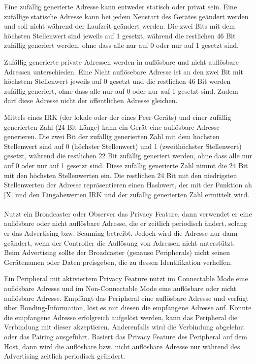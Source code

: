 Eine zufällig generierte Adresse kann entweder statisch oder privat sein. Eine zufällige statische Adresse kann bei jedem Neustart des Gerätes geändert werden und soll nicht während der Laufzeit geändert werden. Die zwei Bits mit dem höchsten Stellenwert sind jeweils auf 1 gesetzt, während die restlichen 46 Bit zufällig generiert werden, ohne dass alle nur auf 0 oder nur auf 1 gesetzt sind.

Zufällig generierte private Adressen werden in auflösbare und nicht auflösbare Adressen unterschieden. Eine Nicht auflösebare Adresse ist an den zwei Bit mit höchstem Stellenwert jeweils auf 0 gesetzt und die restlichen 46 Bit werden zufällig generiert, ohne dass alle nur auf 0 oder nur auf 1 gesetzt sind. Zudem darf diese Adresse nicht der öffentlichen Adresse gleichen.

Mittels eines IRK (der lokale oder der eines Peer-Geräts) und einer zufällig generierten Zahl (24 Bit Länge) kann ein Gerät eine auflösbare Adresse generieren. Die zwei Bit der zufällig generierten Zahl mit dem höchsten Stellenwert sind auf 0 (höchster Stellenwert) und 1 (zweithöchster Stellenwert) gesetzt, während die restlichen 22 Bit zufällig generiert werden, ohne dass alle nur auf 0 oder nur auf 1 gesetzt sind. Diese zufällig generierte Zahl nimmt die 24 Bit mit den höchsten Stellenwerten ein. Die restlichen 24 Bit mit den niedrigsten Stellenwerten der Adresse repräsentieren einen Hashwert, der mit der Funktion ah [X] 
und den Eingabewerten IRK und der zufällig generierten Zahl ermittelt wird.\\\\

Nutzt ein Broadcaster oder Observer das Privacy Feature, dann verwendet er eine auflösbare oder nicht auflösbare Adresse, die er zeitlich periodisch ändert, solang er das Advertising bzw. Scanning betreibt. Jedoch wird die Adresse nur dann geändert, wenn der Controller die Auflösung von Adressen nicht unterstützt. Beim Advertising sollte der Broadcaster (genauso Peripherals) nicht seinen Gerätenamen oder Daten preisgeben, die zu dessen Identifikation verhelfen.

Ein Peripheral mit aktiviertem Privacy Feature nutzt im Connectable Mode eine auflösbare Adresse und im Non-Connectable Mode eine auflösbare oder nicht auflösbare Adresse. Empfängt das Peripheral eine auflösbare Adresse und verfügt über Bonding-Information, löst es mit diesen die empfangene Adresse auf. Konnte die empfangene Adresse erfolgreich aufgelöst werden, kann das Peripheral die Verbindung mit dieser akzeptieren. Anderenfalls wird die Verbindung abgelehnt oder das Pairing ausgeführt. Basiert das Privacy Feature des Peripheral auf dem Host, dann wird die auflösbare bzw. nicht auflösbare Adresse nur während des Advertising zeitlich periodisch geändert.

